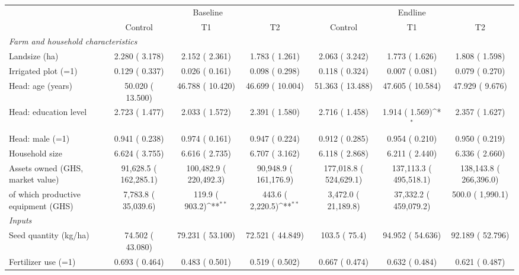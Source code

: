 \def\sym#1{\ifmmode^{#1}\else\(^{#1}\)\fi}
\begin{tabular}{lcccccc}
\toprule
 & \multicolumn{3}{c}{Baseline} & \multicolumn{3}{c}{Endline} \\
\cmidrule(lr){2-4}\cmidrule(lr){5-7}
 & Control & T1 & T2 & Control & T1 & T2 \\
\midrule
\multicolumn{7}{l}{\textit{Farm and household characteristics}}\\
Landsize (ha) &     2.280 (    3.178) &     2.152 (    2.361) &     1.783 (    1.261) &     2.063 (    3.242) &     1.773 (    1.626) &     1.808 (    1.598) \\
Irrigated plot (=1) &     0.129 (    0.337) &     0.026 (    0.161) &     0.098 (    0.298) &     0.118 (    0.324) &     0.007 (    0.081) &     0.079 (    0.270) \\
Head: age (years) &    50.020 (   13.500) &    46.788 (   10.420) &    46.699 (   10.004) &    51.363 (   13.488) &    47.605 (   10.584) &    47.929 (    9.676) \\
Head: education level &     2.723 (    1.477) &     2.033 (    1.572) &     2.391 (    1.580) &     2.716 (    1.458) &     1.914 (    1.569)\sym{*} &     2.357 (    1.627) \\
Head: male (=1) &     0.941 (    0.238) &     0.974 (    0.161) &     0.947 (    0.224) &     0.912 (    0.285) &     0.954 (    0.210) &     0.950 (    0.219) \\
Household size &     6.624 (    3.755) &     6.616 (    2.735) &     6.707 (    3.162) &     6.118 (    2.868) &     6.211 (    2.440) &     6.336 (    2.660) \\
Assets owned (GHS, market value) &     91,628.5 (   162,285.1) &    100,482.9 (   220,492.3) &     90,948.9 (   161,176.9) &    177,018.8 (   524,629.1) &    137,113.3 (   495,518.1) &    138,143.8 (   266,396.0) \\
\quad of which productive equipment (GHS) &      7,783.8 (    35,039.6) &        119.9 (       903.2)\sym{**} &        443.6 (     2,220.5)\sym{**} &      3,472.0 (    21,189.8) &     37,332.2 (   459,079.2) &        500.0 (     1,990.1) \\
\multicolumn{7}{l}{\textit{Inputs}}\\
Seed quantity (kg/ha) &    74.502 (   43.080) &    79.231 (   53.100) &    72.521 (   44.849) &        103.5 (        75.4) &    94.952 (   54.636) &    92.189 (   52.796) \\
Fertilizer use (=1) &     0.693 (    0.464) &     0.483 (    0.501) &     0.519 (    0.502) &     0.667 (    0.474) &     0.632 (    0.484) &     0.621 (    0.487) \\

\end{tabular}
